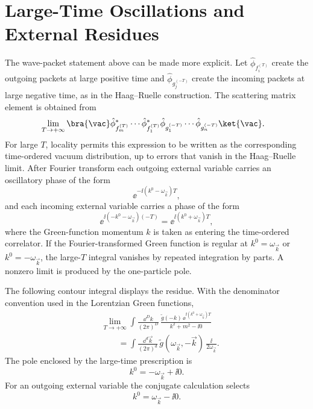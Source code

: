 \section{Large-Time Oscillations and External Residues}

The wave-packet statement above can be made more explicit.  Let
\(\hat\phi_{f_i^{(T)}}\) create the outgoing packets at large positive time and
\(\hat\phi_{g_j^{(-T)}}\) create the incoming packets at large negative time, as
in the Haag--Ruelle construction.  The scattering matrix element is obtained
from
\[
\begin{aligned}
&\lim_{T\to+\infty}
\bra{\vac}
\hat\phi_{f_m^{(T)}}^*\cdots\hat\phi_{f_1^{(T)}}^*
\hat\phi_{g_1^{(-T)}}\cdots\hat\phi_{g_n^{(-T)}}
\ket{\vac} .
\end{aligned}
\]
For large \(T\), locality permits this expression to be written as the
corresponding time-ordered vacuum distribution, up to errors that vanish in the
Haag--Ruelle limit.  After Fourier transform each outgoing external variable
carries an oscillatory phase of the form
\[
  \ee^{-\ii(k^0-\omega_{\vec k})T},
\]
and each incoming external variable carries a phase of the form
\[
  \ee^{\ii(-k^0-\omega_{\vec k})(-T)}
  =
  \ee^{\ii(k^0+\omega_{\vec k})T},
\]
where the Green-function momentum \(k\) is taken as entering the time-ordered
correlator.  If the Fourier-transformed Green function is regular at
\(k^0=\omega_{\vec k}\) or \(k^0=-\omega_{\vec k}\), the large-\(T\) integral
vanishes by repeated integration by parts.  A nonzero limit is produced by the
one-particle pole.

The following contour integral displays the residue.  With the denominator
convention used in the Lorentzian Green functions,
\[
\begin{aligned}
&\lim_{T\to+\infty}
\int\frac{\dd^Dk}{(2\pi)^D}\,
\frac{\widetilde g(-k)\,
\ee^{\ii(k^0+\omega_{\vec k})T}}
     {k^2+m^2-\ii0}
\\
&\qquad =
\int\frac{\dd^d\vec k}{(2\pi)^d}\,
\widetilde g(\omega_{\vec k},-\vec k)\,
\frac{\ii}{2\omega_{\vec k}} .
\end{aligned}
\]
The pole enclosed by the large-time prescription is
\[
  k^0=-\omega_{\vec k}+\ii0 .
\]
For an outgoing external variable the conjugate calculation selects
\[
  k^0=\omega_{\vec k}-\ii0 .
\]

